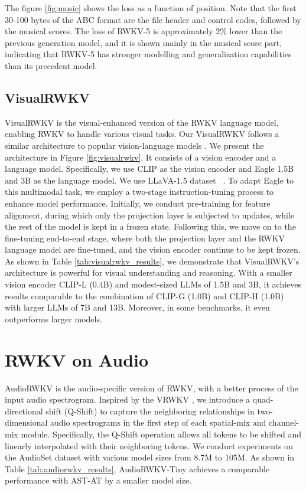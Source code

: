 The figure \ref{fig:music} shows the loss as a function of position. Note that the first 30-100 bytes of the ABC format are the file header and control codes, followed by the musical scores. The loss of RWKV-5 is approximately 2\% lower than the previous generation model, and it is shown mainly in the musical score part, indicating that RWKV-5 has stronger modelling and generalization capabilities than its precedent model.

\subsection{VisualRWKV}
\label{sec:visualrwkv}

VisualRWKV is the visual-enhanced version of the RWKV language model, enabling RWKV to handle various visual tasks. Our VisualRWKV follows a similar architecture to popular vision-language models \citep{liu2023improvedllava15}. We present the architecture in Figure \ref{fig:visualrwkv}. It consists of a vision encoder and a language model. Specifically, we use CLIP \citep{radford2021learningclip} as the vision encoder and Eagle 1.5B and 3B as the language model. We use LLaVA-1.5 dataset ~\citep{liu2023improvedllava15}. To adapt Eagle to this multimodal task, we employ a two-stage instruction-tuning process to enhance model performance. Initially, we conduct pre-training for feature alignment, during which only the projection layer is subjected to updates, while the rest of the model is kept in a frozen state. Following this, we move on to the fine-tuning end-to-end stage, where both the projection layer and the RWKV language model are fine-tuned, and the vision encoder continue to be kept frozen. As shown in Table \ref{tab:visualrwkv_results}, we demonstrate that VisualRWKV's architecture is powerful for visual understanding and reasoning. With a smaller vision encoder CLIP-L (0.4B) and modest-sized LLMs of 1.5B and 3B, it achieves results comparable to the combination of CLIP-G (1.0B) and CLIP-H (1.0B) with larger LLMs of 7B and 13B. Moreover, in some benchmarks, it even outperforms larger models.

\section{RWKV on Audio}
\label{sec:audiorwkv}

AudioRWKV is the audio-specific version of RWKV, with a better process of the input audio spectrogram. Inspired by the VRWKV \citep{wang2024state}, we introduce a quad-directional shift (Q-Shift) to capture the neighboring relationships in two-dimensional audio spectrograms in the first step of each spatial-mix and channel-mix module. Specifically, the Q-Shift operation allows all tokens to be shifted and linearly interpolated with their neighboring tokens. We conduct experiments on the AudioSet \citep{gemmeke2017audio} dataset with various model sizes from 8.7M to 105M. As shown in Table \ref{tab:audiorwkv_results}, AudioRWKV-Tiny achieves a comparable performance with AST-AT by a smaller model size.

